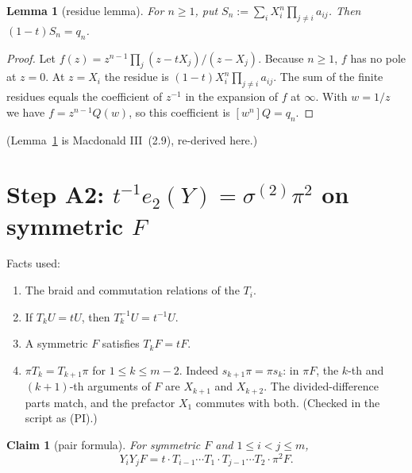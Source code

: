 \documentclass[11pt]{amsart}
\newtheorem{lemma}[theorem]{Lemma}
\newtheorem{claim}[theorem]{Claim}
\theoremstyle{remark}
\begin{document}
\begin{lemma}[residue lemma]\label{lem:L2}
For $n\ge1$, put $S_n := \sum_iX_i^n\prod_{j\ne i}a_{ij}$. Then $(1-t)S_n = q_n$.
\end{lemma}

\begin{proof}
Let $f(z) = z^{n-1}\prod_j(z-tX_j)/(z-X_j)$. Because $n\ge1$, $f$ has no pole at $z=0$. At $z=X_i$ the residue is $(1-t)X_i^n\prod_{j\ne i}a_{ij}$. The sum of the finite residues equals the coefficient of $z^{-1}$ in the expansion of $f$ at $\infty$. With $w=1/z$ we have $f = z^{n-1}Q(w)$, so this coefficient is $[w^n]Q = q_n$.
\end{proof}

(Lemma~\ref{lem:L2} is Macdonald III~(2.9), re-derived here.)

\section{Step A2: $t^{-1}e_2(Y) = \sigma^{(2)}\pi^2$ on symmetric $F$}\label{sec:A2}

Facts used:
\begin{enumerate}[label=(\roman*)]
\item The braid and commutation relations of the $T_i$.
\item If $T_kU = tU$, then $T_k^{-1}U = t^{-1}U$.
\item A symmetric $F$ satisfies $T_kF = tF$.
\item $\pi T_k = T_{k+1}\pi$ for $1\le k\le m-2$. Indeed $s_{k+1}\pi = \pi s_k$: in $\pi F$, the $k$-th and $(k+1)$-th arguments of $F$ are $X_{k+1}$ and $X_{k+2}$. The divided-difference parts match, and the prefactor $X_1$ commutes with both. (Checked in the script as (PI).)
\end{enumerate}

\begin{claim}[pair formula]\label{cl:pair}
For symmetric $F$ and $1\le i<j\le m$,
\[
Y_iY_jF = t\cdot T_{i-1}\cdots T_1\cdot T_{j-1}\cdots T_2\cdot\pi^2F.
\]
\end{claim}
\end{document}
